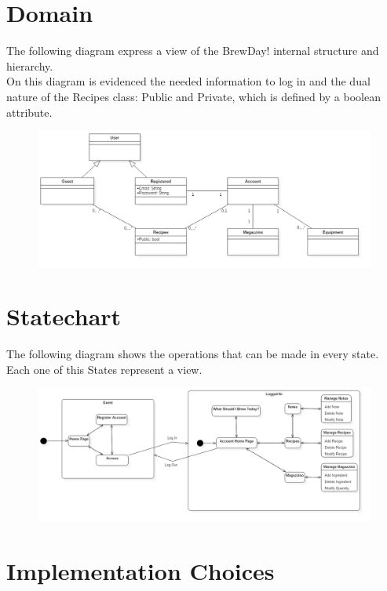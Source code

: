 \documentclass[12pt]{article}
\begin{document}
\section{Domain}
The following diagram express a view of the BrewDay! internal structure and hierarchy.\\
On this diagram is evidenced the needed information to log in and the dual nature of the Recipes class: Public and Private, which is defined by a boolean attribute.
\begin{figure}[H]
\includegraphics[width=1.25\textwidth, left]{DomainDiagram.jpg}
\end{figure}

\pagebreak
\section{Statechart}
The following diagram shows the operations that can be made in every state.\\
Each one of this States represent a view.
\begin{figure}[H]
\includegraphics[scale=0.4]{Statechart.png}
\end{figure}
\section{Implementation Choices}
\end{document}
